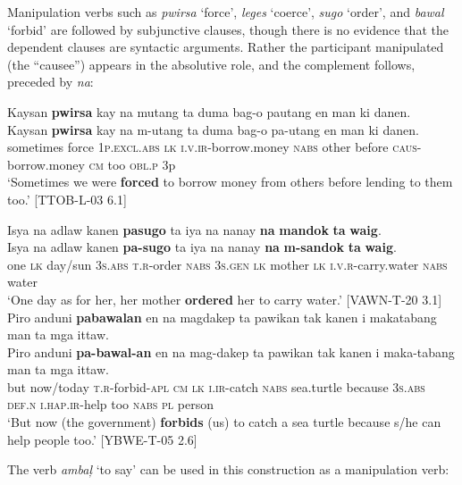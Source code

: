Manipulation verbs such as \textit{pwirsa} ‘force’, \textit{leges} ‘coerce’, \textit{sugo} ‘order’, and \textit{bawal} ‘forbid’ are followed by subjunctive clauses, though there is no evidence that the dependent clauses are syntactic arguments. Rather the participant manipulated (the “causee”) appears in the absolutive role, and the complement follows, preceded by \textit{na}:

\ea
Kaysan  \textbf{pwirsa}  kay  na  mutang  ta  duma  bag-o pautang  en  man  ki  danen. \smallskip\\
\gll Kaysan  \textbf{pwirsa}  kay  na  m-utang  ta  duma  bag-o pa-utang  en  man  ki  danen. \\
sometimes  force  1\textsc{p.excl.abs}  \textsc{lk}  \textsc{i.v.ir}-borrow.money  \textsc{nabs}  other  before
\textsc{caus}-borrow.money  \textsc{cm}  too  \textsc{obl.p}  3p \\
\glt `Sometimes we were \textbf{forced} to borrow money from others before lending to them too.’ [TTOB-L-03 6.1]
\z

\ea
Isya  na  adlaw  kanen  \textbf{pasugo}  ta  iya  na  nanay  \textbf{na}  \textbf{mandok} \textbf{ta}  \textbf{waig}. \smallskip\\
\gll Isya  na  adlaw  kanen  \textbf{pa-sugo}  ta  iya  na  nanay  \textbf{na}  \textbf{m-sandok} \textbf{ta}  \textbf{waig}. \\
one  \textsc{lk}  day/sun  3\textsc{s.abs}  \textsc{t.r}-order  \textsc{nabs}  3\textsc{s.gen}  \textsc{lk}  mother  \textsc{lk}  \textsc{i.v.r}-carry.water \textsc{nabs}  water \\
\glt `One day as for her, her mother \textbf{ordered} her to carry water.’ [VAWN-T-20 3.1]
\z
\ea
Piro  anduni  \textbf{pabawalan}  en  na  magdakep  ta  pawikan tak  kanen  i  makatabang  man  ta  mga  ittaw. \smallskip\\
\gll Piro  anduni  \textbf{pa-bawal-an}  en  na  mag-dakep  ta  pawikan tak  kanen  i  maka-tabang  man  ta  mga  ittaw. \\
but  now/today  \textsc{t.r}-forbid-\textsc{apl}  \textsc{cm}  \textsc{lk}  \textsc{i.ir}-catch  \textsc{nabs}  sea.turtle
because  3\textsc{s.abs}  \textsc{def.n}  \textsc{i.hap.ir}-help  too  \textsc{nabs}  \textsc{pl}  person \\
\glt `But now (the government) \textbf{forbids} (us) to catch a sea turtle because s/he can help people too.’ [YBWE-T-05 2.6]
\z

The verb \textit{ambaļ} ‘to say’ can be used in this construction as a manipulation verb:

